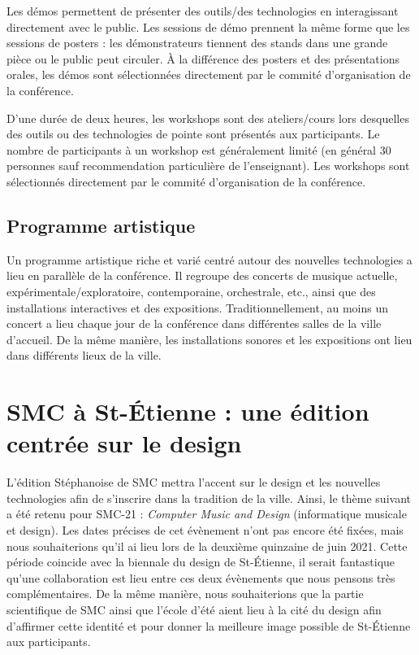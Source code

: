\documentclass[fontsize=12pt]{scrartcl} %
\numberwithin{equation}{section} %
\numberwithin{figure}{section} %
\numberwithin{table}{section} %
\begin{document}
Les démos permettent de présenter des outils/des technologies en interagissant directement avec le public. Les sessions de démo prennent la même forme que les sessions de posters : les démonstrateurs tiennent des stands dans une grande pièce ou le public peut circuler. À la différence des posters et des présentations orales, les démos sont sélectionnées directement par le commité d'organisation de la conférence.

D'une durée de deux heures, les workshops sont des ateliers/cours lors desquelles des outils ou des technologies de pointe sont présentés aux participants. Le nombre de participants à un workshop est généralement limité (en général 30 personnes sauf recommendation particulière de l'enseignant). Les workshops sont sélectionnés directement par le commité d'organisation de la conférence.

\subsection{Programme artistique} 

Un programme artistique riche et varié centré autour des nouvelles technologies a lieu en parallèle de la conférence. Il regroupe des concerts de musique actuelle, expérimentale/exploratoire, contemporaine, orchestrale, etc., ainsi que des installations interactives et des expositions. Traditionnellement, au moins un concert a lieu chaque jour de la conférence dans différentes salles de la ville d'accueil. De la même manière, les installations sonores et les expositions ont lieu dans différents lieux de la ville.

\section{SMC à St-Étienne : une édition centrée sur le design}

L'édition Stéphanoise de SMC mettra l'accent sur le design et les nouvelles technologies afin de s'inscrire dans la tradition de la ville. Ainsi, le thème suivant a été retenu pour SMC-21 : \textit{Computer Music and Design} (informatique musicale et design). Les dates précises de cet évènement n'ont pas encore été fixées, mais nous souhaiterions qu'il ai lieu lors de la deuxième quinzaine de juin 2021. Cette période coincide avec la biennale du design de St-Étienne, il serait fantastique qu'une collaboration est lieu entre ces deux évènements que nous pensons très complémentaires. De la même manière, nous souhaiterions que la partie scientifique de SMC ainsi que l'école d'été aient lieu à la cité du design afin d'affirmer cette identité et pour donner la meilleure image possible de St-Étienne aux participants. 
\end{document}
